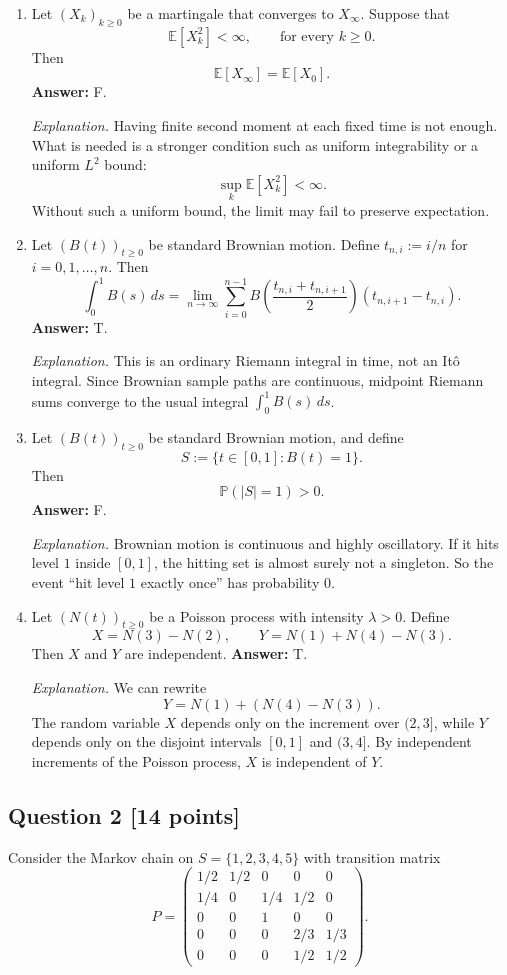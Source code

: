 \documentclass[11pt]{article}
\theoremstyle{definition}
\begin{document}
\begin{enumerate}[label=(\arabic*)]
    \item Let $(X_k)_{k\ge 0}$ be a martingale that converges to $X_\infty$. Suppose that
    \[
    \mathbb E[X_k^2] < \infty, \qquad \text{for every } k\ge 0.
    \]
    Then
    \[
    \mathbb E[X_\infty] = \mathbb E[X_0].
    \]
    \textbf{Answer:} F.

    \emph{Explanation.} Having finite second moment at each fixed time is not enough. What is needed is a stronger condition such as uniform integrability or a uniform $L^2$ bound:
    \[
    \sup_k \mathbb E[X_k^2] < \infty.
    \]
    Without such a uniform bound, the limit may fail to preserve expectation.

    \item Let $(B(t))_{t\ge 0}$ be standard Brownian motion. Define $t_{n,i}:=i/n$ for $i=0,1,\dots,n$. Then
    \[
    \int_0^1 B(s)\,ds
    =
    \lim_{n\to\infty}
    \sum_{i=0}^{n-1}
    B\!\left(\frac{t_{n,i}+t_{n,i+1}}{2}\right)
    (t_{n,i+1}-t_{n,i}).
    \]
    \textbf{Answer:} T.

    \emph{Explanation.} This is an ordinary Riemann integral in time, not an It\^o integral. Since Brownian sample paths are continuous, midpoint Riemann sums converge to the usual integral $\int_0^1 B(s)\,ds$.

    \item Let $(B(t))_{t\ge 0}$ be standard Brownian motion, and define
    \[
    S:=\{t\in[0,1]: B(t)=1\}.
    \]
    Then
    \[
    \mathbb P(|S|=1)>0.
    \]
    \textbf{Answer:} F.

    \emph{Explanation.} Brownian motion is continuous and highly oscillatory. If it hits level $1$ inside $[0,1]$, the hitting set is almost surely not a singleton. So the event ``hit level $1$ exactly once'' has probability $0$.

    \item Let $(N(t))_{t\ge 0}$ be a Poisson process with intensity $\lambda>0$. Define
    \[
    X = N(3)-N(2),
    \qquad
    Y = N(1)+N(4)-N(3).
    \]
    Then $X$ and $Y$ are independent.
    \textbf{Answer:} T.

    \emph{Explanation.} We can rewrite
    \[
    Y = N(1) + (N(4)-N(3)).
    \]
    The random variable $X$ depends only on the increment over $(2,3]$, while $Y$ depends only on the disjoint intervals $[0,1]$ and $(3,4]$. By independent increments of the Poisson process, $X$ is independent of $Y$.
\end{enumerate}

\subsection*{Question 2 \hfill [14 points]}
Consider the Markov chain on $S=\{1,2,3,4,5\}$ with transition matrix
\[
P=
\begin{pmatrix}
1/2 & 1/2 & 0 & 0 & 0\\
1/4 & 0 & 1/4 & 1/2 & 0\\
0 & 0 & 1 & 0 & 0\\
0 & 0 & 0 & 2/3 & 1/3\\
0 & 0 & 0 & 1/2 & 1/2
\end{pmatrix}.
\]
\end{document}
